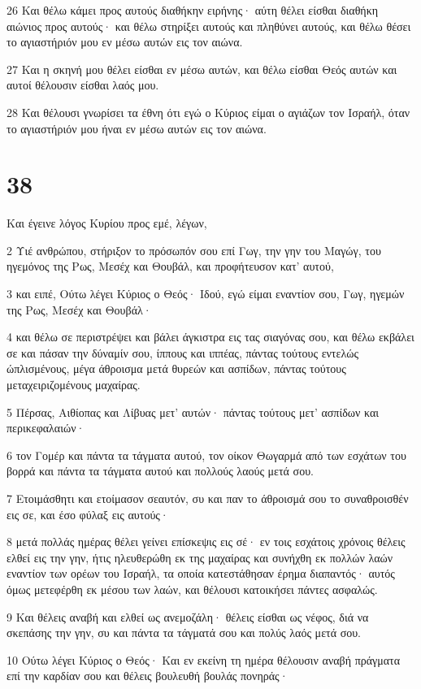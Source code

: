 \par 26 Και θέλω κάμει προς αυτούς διαθήκην ειρήνης· αύτη θέλει είσθαι διαθήκη αιώνιος προς αυτούς· και θέλω στηρίξει αυτούς και πληθύνει αυτούς, και θέλω θέσει το αγιαστήριόν μου εν μέσω αυτών εις τον αιώνα.
\par 27 Και η σκηνή μου θέλει είσθαι εν μέσω αυτών, και θέλω είσθαι Θεός αυτών και αυτοί θέλουσιν είσθαι λαός μου.
\par 28 Και θέλουσι γνωρίσει τα έθνη ότι εγώ ο Κύριος είμαι ο αγιάζων τον Ισραήλ, όταν το αγιαστήριόν μου ήναι εν μέσω αυτών εις τον αιώνα.

\chapter{38}

\par Και έγεινε λόγος Κυρίου προς εμέ, λέγων,
\par 2 Υιέ ανθρώπου, στήριξον το πρόσωπόν σου επί Γωγ, την γην του Μαγώγ, του ηγεμόνος της Ρως, Μεσέχ και Θουβάλ, και προφήτευσον κατ' αυτού,
\par 3 και ειπέ, Ούτω λέγει Κύριος ο Θεός· Ιδού, εγώ είμαι εναντίον σου, Γωγ, ηγεμών της Ρως, Μεσέχ και Θουβάλ·
\par 4 και θέλω σε περιστρέψει και βάλει άγκιστρα εις τας σιαγόνας σου, και θέλω εκβάλει σε και πάσαν την δύναμίν σου, ίππους και ιππέας, πάντας τούτους εντελώς ώπλισμένους, μέγα άθροισμα μετά θυρεών και ασπίδων, πάντας τούτους μεταχειριζομένους μαχαίρας.
\par 5 Πέρσας, Αιθίοπας και Λίβυας μετ' αυτών· πάντας τούτους μετ' ασπίδων και περικεφαλαιών·
\par 6 τον Γομέρ και πάντα τα τάγματα αυτού, τον οίκον Θωγαρμά από των εσχάτων του βορρά και πάντα τα τάγματα αυτού και πολλούς λαούς μετά σου.
\par 7 Ετοιμάσθητι και ετοίμασον σεαυτόν, συ και παν το άθροισμά σου το συναθροισθέν εις σε, και έσο φύλαξ εις αυτούς·
\par 8 μετά πολλάς ημέρας θέλει γείνει επίσκεψις εις σέ· εν τοις εσχάτοις χρόνοις θέλεις ελθεί εις την γην, ήτις ηλευθερώθη εκ της μαχαίρας και συνήχθη εκ πολλών λαών εναντίον των ορέων του Ισραήλ, τα οποία κατεστάθησαν έρημα διαπαντός· αυτός όμως μετεφέρθη εκ μέσου των λαών, και θέλουσι κατοικήσει πάντες ασφαλώς.
\par 9 Και θέλεις αναβή και ελθεί ως ανεμοζάλη· θέλεις είσθαι ως νέφος, διά να σκεπάσης την γην, συ και πάντα τα τάγματά σου και πολύς λαός μετά σου.
\par 10 Ούτω λέγει Κύριος ο Θεός· Και εν εκείνη τη ημέρα θέλουσιν αναβή πράγματα επί την καρδίαν σου και θέλεις βουλευθή βουλάς πονηράς·

